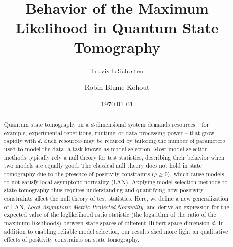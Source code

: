 \documentclass[aps,pra, twocolumn]{revtex4-1}
\begin{document}
\author{Travis L Scholten}
\author{Robin Blume-Kohout}

\title{Behavior of the Maximum Likelihood in Quantum State Tomography}

\begin{abstract}
Quantum state tomography on a $d$-dimensional system demands resources -- for example, experimental repetitions, runtime, or data processing power -- that grow rapidly with $d$. Such resources may be reduced by tailoring the number of parameters used to model the data, a task known as model selection.  Most model selection methods typically rely a null theory for test statistics, describing their behavior when two models are equally good.  The classical null theory does not hold in state tomography due to the presence of positivity constraints ($\rho\geq0$), which cause models to not satisfy  local asymptotic normality (LAN).  Applying model selection methods to state tomography thus requires understanding and quantifying how positivity constraints affect the null theory of test statistics.  Here, we define a new generalization of LAN, \emph{Local Asymptotic Metric-Projected Normality}, and derive an expression for the expected value of the loglikelihood ratio statistic (the logarithm of the ratio of the maximum likelihoods) between  state spaces of different Hilbert space dimension $d$.  In addition to enabling reliable model selection, our results shed more light on qualitative effects of positivity constraints on state tomography.
\end{abstract}
\date{\today}

\maketitle
\end{document}
